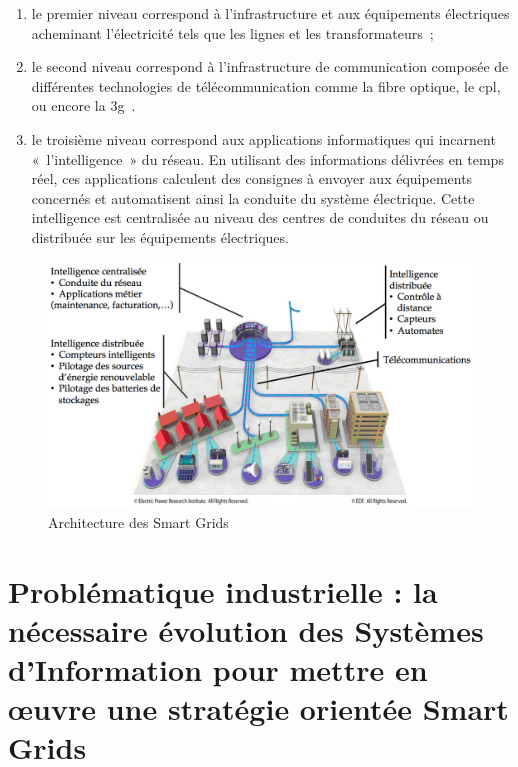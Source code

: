 \begin{enumerate}
    \item le premier niveau correspond à l'infrastructure et aux équipements 
    électriques acheminant l'électricité tels que les lignes et les 
    transformateurs~; 
    \item le second niveau correspond à l'infrastructure de communication 
    composée de différentes technologies de télécommunication comme la fibre 
    optique, le \gls{cpl}, ou encore la \gls{3g}~. 
    \item le troisième niveau correspond aux applications informatiques qui 
    incarnent «~l'intelligence~» du réseau. En utilisant des informations 
    délivrées en temps réel, ces applications calculent des consignes à envoyer 
    aux équipements concernés et automatisent ainsi la conduite du système 
    électrique.  Cette intelligence est centralisée au niveau des centres de 
    conduites du réseau ou distribuée sur les équipements électriques. 
\end{enumerate}

\begin{figure}[!htbp]
  \includegraphics[width=1\textwidth]{figures/images/problematique/archiSmartGrids.png}
 \caption{Architecture des Smart Grids \protect\cite{favre2006ingenierie}}
 \label{fig:archismartGrids}
\end{figure}



\section{Problématique industrielle : la nécessaire évolution des Systèmes 
d'Information pour mettre en œuvre une stratégie orientée Smart Grids}

